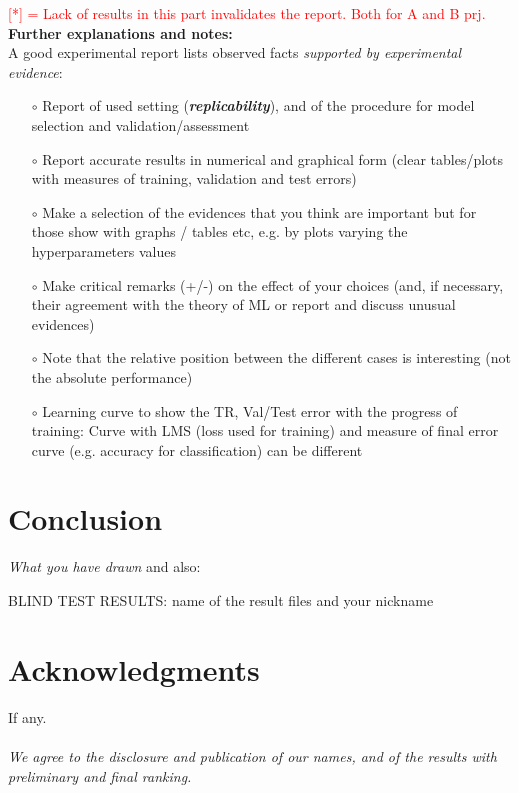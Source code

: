 \documentclass[11pt, letterpaper]{article}  %
\begin{document}
\textcolor{red}{[*] = Lack of results in this part invalidates the report. Both for A and B prj.} \\
\textbf{Further explanations and notes:} \\
A good experimental report lists observed facts \textit{supported by experimental evidence}:
\begin{itemize}
    \setlength\itemsep{-0.25em}
    \item[$\circ$] Report of used  setting (\textbf{\textit{replicability}}), and of the procedure for model selection and validation/assessment
    \item[$\circ$] Report accurate results in numerical and graphical form (clear tables/plots with measures of training, validation and test errors)
    \item[$\circ$] Make a selection of the evidences that you think are important but for those  show with graphs / tables etc, e.g. by plots varying the hyperparameters values
    \item[$\circ$] Make critical remarks (+/-) on the effect of your choices (and, if necessary, their agreement with the theory of ML or report and discuss unusual evidences)
    \item[$\circ$] Note that the relative position between the different cases is interesting (not the absolute performance)
    \item[$\circ$] Learning curve to show the TR, Val/Test error with the progress of training: Curve with LMS (loss used for training) and measure of final error curve (e.g. accuracy for classification) can be different
 
\end{itemize}

         
        
\section{Conclusion}
\textit{What you have drawn} and also:

BLIND TEST RESULTS: name of the result files  and your nickname

\section*{Acknowledgments}
If any. \\ \\

\noindent\textit{We agree to the disclosure and publication of our names, and of the results with preliminary and final ranking.}
\end{document}
